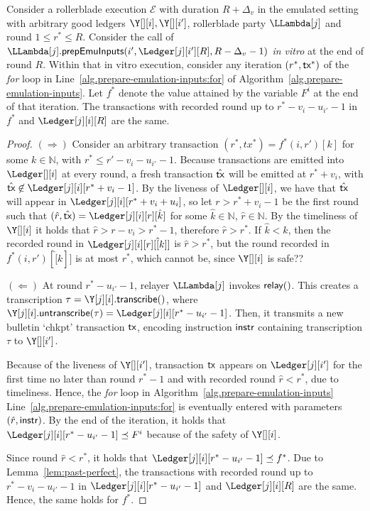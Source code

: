 \begin{lemma}\label{lem:transcription-past-perfect}
  Consider a rollerblade execution $\mathcal{E}$ with duration $R + \Delta_v$ in the emulated setting
  with arbitrary good ledgers $\Y[][i], \Y[][i']$, rollerblade party $\LLambda[j]$
  and round $1 \leq r^* \leq R$.
  Consider the call of $\LLambda[j].\prepareEmulationInputs(i', \Ledger[j][i'][R], R - \Delta_v - 1)$
  \emph{in vitro} at the end of round $R$.
  Within that in vitro execution,
  consider any iteration $(r^*, \textsf{tx}^*)$ of the
  \emph{for} loop in Line~\ref{alg.prepare-emulation-inputs:for}
  of Algorithm~\ref{alg.prepare-emulation-inputs}.
  Let $f^*$ denote the value attained by the variable $F^i$
  at the end of that iteration.
  The transactions with recorded round
  up to $r^* - v_i - u_{i'} - 1$ in $f^*$ and $\Ledger[j][i][R]$ are the same.
\end{lemma}
\begin{proof}
  \noindent
  \textbf{$(\Longrightarrow)$} Consider an arbitrary transaction $(r^*, tx^*) = f^*(i, r')[k]$
  for some $k \in \mathbb{N}$, with $r^* \leq r' - v_i - u_{i'} - 1$.
  Because transactions are emitted into $\Ledger[][i]$
  at every round, a fresh transaction $\hat{\textsf{tx}}$ will be emitted at $r^* + v_i$,
  with $\hat{\tx} \not\in \Ledger[j][i][r^* + v_i - 1]$.
  By the liveness of $\Ledger[][i]$, we have that $\hat{\textsf{tx}}$ will appear in
  $\Ledger[j][i][r^* + v_i + u_i]$, so let $r > r^* + v_i - 1$ be the first round such that
  $(\hat{r}, \hat{\tx}) = \Ledger[j][i][r][\hat{k}]$
  for some $\hat{k} \in \mathbb{N}$, $\hat{r} \in \mathbb{N}$.
  By the timeliness of $\Y[][i]$ it holds that $\hat{r} > r - v_i > r^* - 1$,
  therefore $\hat{r} > r^*$.
  If $\hat{k} < k$, then the recorded round in
  $\Ledger[j][i][r][\hat[k]]$ is $\hat{r} > r^*$,
  but the round recorded in $f^*(i, r')[\hat[k]]$ is at most $r^*$,
  which cannot be, since $\Y[][i]$ is safe??

  \noindent
  \textbf{$(\Longleftarrow)$}
  At round $r^* - u_{i'} - 1$, relayer $\LLambda[j]$ invokes $\textsf{relay}()$.
  This creates a transcription $\tau = \Y[j][i].\transcribe()$, where
  $\Y[j][i].\untranscribe(\tau) = \Ledger[j][i][r^* - u_{i'} - 1]$.
  Then, it transmits a new bulletin `chkpt' transaction $\textsf{tx}$,
  encoding instruction $\textsf{instr}$ containing transcription $\tau$ to $\Y[][i']$.

  Because of the liveness of $\Y[][i']$, transaction $\textsf{tx}$ appears on $\Ledger[j][i']$ for the
  first time no later than round $r^* - 1$ and with recorded round $\hat{r} < r^*$, due to timeliness.
  Hence, the \emph{for} loop in Algorithm~\ref{alg.prepare-emulation-inputs}
  Line~\ref{alg.prepare-emulation-inputs:for} is eventually entered with
  parameters $(\hat{r}, \textsf{instr})$. By the end of the iteration, it holds that
  $\Ledger[j][i][r^* - u_{i'} - 1] \preceq F^i$ because of the safety of $\Y[][i]$.

  Since round $\hat{r} < r^*$, it holds that $\Ledger[j][i][r^* - u_{i'} - 1] \preceq f^*$.
  Due to Lemma~\ref{lem:past-perfect}, the transactions
  with recorded round up to $r^* - v_i - u_{i'} - 1$ in $\Ledger[j][i][r^* - u_{i'} - 1]$
  and $\Ledger[j][i][R]$ are the same.
  Hence, the same holds for $f^*$.\Qed
\end{proof}

